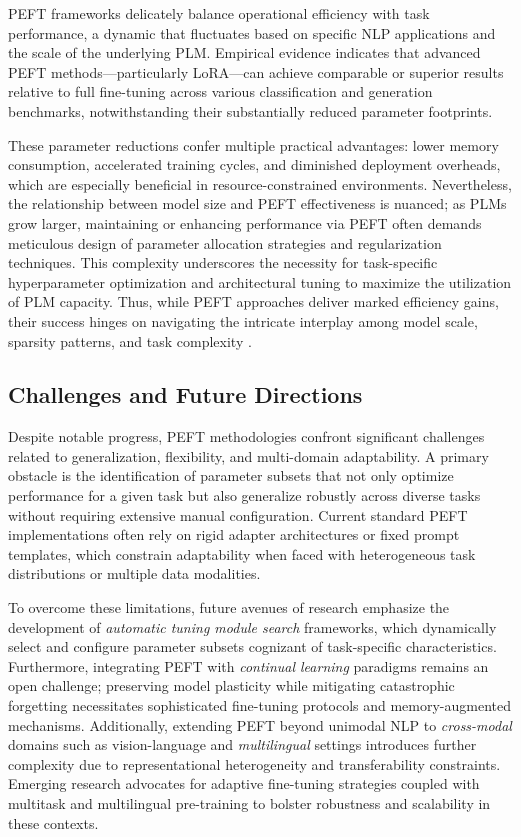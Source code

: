 PEFT frameworks delicately balance operational efficiency with task performance, a dynamic that fluctuates based on specific NLP applications and the scale of the underlying PLM. Empirical evidence indicates that advanced PEFT methods—particularly LoRA—can achieve comparable or superior results relative to full fine-tuning across various classification and generation benchmarks, notwithstanding their substantially reduced parameter footprints. 

These parameter reductions confer multiple practical advantages: lower memory consumption, accelerated training cycles, and diminished deployment overheads, which are especially beneficial in resource-constrained environments. Nevertheless, the relationship between model size and PEFT effectiveness is nuanced; as PLMs grow larger, maintaining or enhancing performance via PEFT often demands meticulous design of parameter allocation strategies and regularization techniques. This complexity underscores the necessity for task-specific hyperparameter optimization and architectural tuning to maximize the utilization of PLM capacity. Thus, while PEFT approaches deliver marked efficiency gains, their success hinges on navigating the intricate interplay among model scale, sparsity patterns, and task complexity \cite{ref48}.

\subsection{Challenges and Future Directions}

Despite notable progress, PEFT methodologies confront significant challenges related to generalization, flexibility, and multi-domain adaptability. A primary obstacle is the identification of parameter subsets that not only optimize performance for a given task but also generalize robustly across diverse tasks without requiring extensive manual configuration. Current standard PEFT implementations often rely on rigid adapter architectures or fixed prompt templates, which constrain adaptability when faced with heterogeneous task distributions or multiple data modalities.

To overcome these limitations, future avenues of research emphasize the development of \textit{automatic tuning module search} frameworks, which dynamically select and configure parameter subsets cognizant of task-specific characteristics. Furthermore, integrating PEFT with \textit{continual learning} paradigms remains an open challenge; preserving model plasticity while mitigating catastrophic forgetting necessitates sophisticated fine-tuning protocols and memory-augmented mechanisms. Additionally, extending PEFT beyond unimodal NLP to \textit{cross-modal} domains such as vision-language and \textit{multilingual} settings introduces further complexity due to representational heterogeneity and transferability constraints. Emerging research advocates for adaptive fine-tuning strategies coupled with multitask and multilingual pre-training to bolster robustness and scalability in these contexts.

